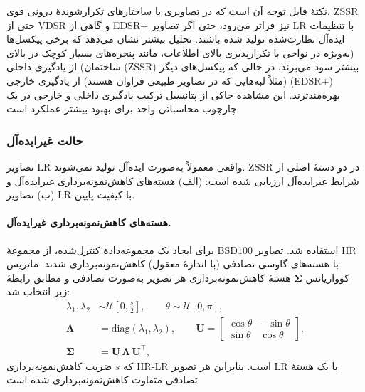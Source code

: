 نکتهٔ قابل توجه آن است که در تصاویری با ساختارهای تکرارشوندهٔ
درونی قوی، ZSSR حتی از VDSR و گاهی از EDSR+ نیز فراتر می‌رود،
حتی اگر تصاویر LR با تنظیمات ایده‌آل نظارت‌شده تولید شده باشند.
تحلیل بیشتر نشان می‌دهد که برخی پیکسل‌ها (به‌ویژه در نواحی با
تکرارپذیری بالای اطلاعات، مانند پنجره‌های بسیار کوچک در بالای
ساختمان) از یادگیری داخلی (ZSSR) بیشتر سود می‌برند، در حالی که
پیکسل‌های دیگر (مثلاً لبه‌هایی که در تصاویر طبیعی فراوان هستند)
از یادگیری خارجی (EDSR+) بهره‌مند‌ترند. این مشاهده حاکی از
پتانسیل ترکیب یادگیری داخلی و خارجی در یک چارچوب محاسباتی واحد
برای بهبود بیشتر عملکرد است.

\subsubsection{حالت غیرایده‌آل}

تصاویر LR واقعی معمولاً به‌صورت ایده‌آل تولید نمی‌شوند. ZSSR در دو
دستهٔ اصلی از شرایط غیرایده‌آل ارزیابی شده است:
(الف) هسته‌های کاهش‌نمونه‌برداری غیرایده‌آل و
(ب) تصاویر LR با کیفیت پایین.

\paragraph{هسته‌های کاهش‌نمونه‌برداری غیرایده‌آل.}
برای ایجاد یک مجموعه‌دادهٔ کنترل‌شده، از مجموعهٔ BSD100
استفاده شد. تصاویر HR با هسته‌های گاوسی تصادفی (با اندازهٔ معقول)
کاهش‌نمونه‌برداری شدند. ماتریس کوواریانس $\boldsymbol{\Sigma}$ هستهٔ
کاهش‌نمونه‌برداری هر تصویر به‌صورت تصادفی و مطابق رابطهٔ زیر انتخاب شد:
\begin{align}
	\lambda_1, \lambda_2 &\sim \mathcal{U}\!\left[0, \tfrac{s}{2}\right],
	\qquad \theta \sim \mathcal{U}[0, \pi],
	\nonumber\\[4pt]
	\boldsymbol{\Lambda} &= \mathrm{diag}(\lambda_1, \lambda_2),
	\qquad
	\mathbf{U} =
	\begin{bmatrix}
		\cos\theta & -\sin\theta \\
		\sin\theta & \cos\theta
	\end{bmatrix},
	\nonumber\\[4pt]
	\boldsymbol{\Sigma} &= \mathbf{U}\,\boldsymbol{\Lambda}\,\mathbf{U}^{\!\top},
	\label{eq:zssr_kernel}
\end{align}
که $s$ ضریب کاهش‌نمونه‌برداری HR-LR است. بنابراین هر تصویر LR با یک
هستهٔ تصادفی متفاوت کاهش‌نمونه‌برداری شده است.

